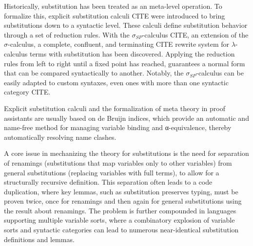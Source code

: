 \documentclass[screen,nonacm]{acmart}
\begin{document}
Historically, substitution has been treated as an meta-level operation. To
formalize this, explicit substitution calculi CITE were introduced to bring
substitutions down to a syntactic level. These calculi define substitution
behavior through a set of reduction rules. With the $σ_{SP}$-calculus CITE, an
extension of the $σ$-calculus, a complete, confluent, and terminating CITE
rewrite system for $λ$-calculus terms with substitution has been discovered.
Applying the reduction rules from left to right until a fixed point has
reached, guarantees a normal form that can be compared syntactically to
another. Notably, the $σ_{SP}$-calculus can be easily adapted to custom
syntaxes, even ones with more than one syntactic category CITE.

Explicit substitution calculi and the formalization of meta theory in proof
assistants are usually based on de Bruijn indices, which provide an automatic
and name-free method for managing variable binding and α-equivalence, thereby
automatically resolving name clashes.

A core issue in mechanizing the theory for substitutions is the need for
separation of renamings (substitutions that map variables only to other
variables) from general substitutions (replacing variables with full terms), to
allow for a structurally recursive definition. This separation often leads to a
code duplication, where key lemmas, such as substitution preserves typing, must
be proven twice, once for renamings and then again for general substitutions
using the result about renamings. The problem is further compounded in
languages supporting multiple variable sorts, where a combinatory explosion of
variable sorts and syntactic categories can lead to numerous near-identical
substitution definitions and lemmas.
\end{document}
